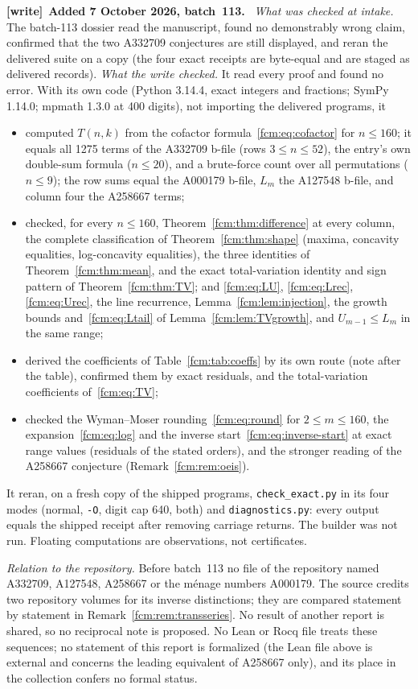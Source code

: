 \documentclass[11pt,letterpaper]{article}
\theoremstyle{remark}\newtheorem{remark}[theorem]{Remark}
\newcommand{\file}[1]{\nolinkurl{#1}}
\newenvironment{writenote}[1][]{\par\smallskip\begingroup\small
 \noindent\textbf{[write]}\if\relax\detokenize{#1}\relax\else~\textbf{#1.}\fi\ }%
 {\par\endgroup\smallskip}
\begin{document}
\begin{writenote}[Added 7 October 2026, batch~113]
\emph{What was checked at intake.} The batch-113 dossier read the manuscript,
found no demonstrably wrong claim, confirmed that the two A332709 conjectures
are still displayed, and reran the delivered suite on a copy (the four exact
receipts are byte-equal and are staged as delivered records). \emph{What the
write checked.} It read every proof and found no error. With its own code
(Python 3.14.4, exact integers and fractions; SymPy 1.14.0; mpmath 1.3.0 at
400 digits), not importing the delivered programs, it
\begin{itemize}\raggedright
\item computed $T(n,k)$ from the cofactor formula~\eqref{fcm:eq:cofactor} for
$n\le160$; it equals all 1275 terms of the A332709 b-file (rows $3\le n\le52$),
the entry's own double-sum formula ($n\le20$), and a brute-force count over all
permutations ($n\le9$); the row sums equal the A000179 b-file, $L_m$ the
A127548 b-file, and column four the A258667 terms;
\item checked, for every $n\le160$, Theorem~\ref{fcm:thm:difference} at every
column, the complete classification of Theorem~\ref{fcm:thm:shape} (maxima,
concavity equalities, log-concavity equalities), the three identities of
Theorem~\ref{fcm:thm:mean}, and the exact total-variation identity and sign
pattern of Theorem~\ref{fcm:thm:TV}; and \eqref{fcm:eq:LU}, \eqref{fcm:eq:Lrec},
\eqref{fcm:eq:Urec}, the line recurrence, Lemma~\ref{fcm:lem:injection}, the
growth bounds and~\eqref{fcm:eq:Ltail} of Lemma~\ref{fcm:lem:TVgrowth}, and
$U_{m-1}\le L_m$ in the same range;
\item derived the coefficients of Table~\ref{fcm:tab:coeffs} by its own route
(note after the table), confirmed them by exact residuals, and the
total-variation coefficients of~\eqref{fcm:eq:TV};
\item checked the Wyman--Moser rounding~\eqref{fcm:eq:round} for
$2\le m\le160$, the expansion~\eqref{fcm:eq:log} and the inverse
start~\eqref{fcm:eq:inverse-start} at exact range values (residuals of the
stated orders), and the stronger reading of the A258667 conjecture
(Remark~\ref{fcm:rem:oeis}).
\end{itemize}
It reran, on a fresh copy of the shipped programs, \file{check_exact.py} in
its four modes (normal, \texttt{-O}, digit cap 640, both) and
\file{diagnostics.py}: every output equals the shipped receipt after removing
carriage returns. The builder was not run. Floating computations are
observations, not certificates.

\emph{Relation to the repository.} Before batch~113 no file of the repository
named A332709, A127548, A258667 or the m\'enage numbers A000179. The source
credits two repository volumes for its inverse distinctions; they are
compared statement by statement in Remark~\ref{fcm:rem:transseries}. No
result of another report is shared, so no reciprocal note is proposed. No
Lean or Rocq file treats these sequences; no statement of this report is
formalized (the Lean file above is external and concerns the leading
equivalent of A258667 only), and its place in the collection confers no formal
status.
\end{writenote}
\end{document}
